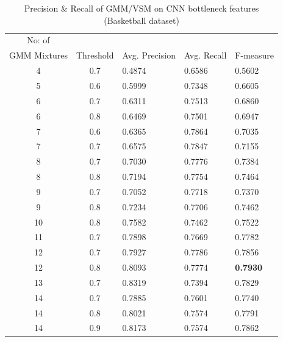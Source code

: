 \begin{table}[ht]
\caption[Event spotting using GMM/VSM on CNN(Gray,Frame diff,Edge) bottleneck features (Basketball dataset) ]{ Precision \& Recall  of GMM/VSM on CNN bottleneck features (Basketball dataset)}
\label{table:cnn_gmm_res_basket}
\centering
\begin{tabular}{|c|c|l|l|l|}
\hline
No: of &&&&\\
GMM Mixtures & Threshold & Avg. Precision & Avg. Recall & F-measure\\
\hline
\hline
4   &0.7    &0.4874     & 0.6586    &0.5602\\
5   &0.6    &0.5999     & 0.7348    &0.6605\\
6   &0.7    &0.6311     & 0.7513    &0.6860\\
6   &0.8    &0.6469     & 0.7501    &0.6947\\
7   &0.6    &0.6365     & 0.7864    &0.7035\\
7   &0.7    &0.6575     & 0.7847    &0.7155\\
8   &0.7    &0.7030     & 0.7776    &0.7384\\
8   &0.8    &0.7194     & 0.7754    &0.7464\\
9   &0.7    &0.7052     & 0.7718    &0.7370\\
9   &0.8    &0.7234     & 0.7706    &0.7462\\
10  &0.8    &0.7582     & 0.7462    &0.7522\\
11  &0.7    &0.7898     & 0.7669    &0.7782\\
12  &0.7    &0.7927     & 0.7786    &0.7856\\
12  &0.8    &0.8093     & 0.7774    &\textbf{0.7930}\\
13  &0.7    &0.8319     & 0.7394    &0.7829\\
14  &0.7    &0.7885     & 0.7601    &0.7740\\
14  &0.8    &0.8021     & 0.7574    &0.7791\\
14  &0.9    &0.8173     & 0.7574    &0.7862\\
\hline  
\end{tabular}
\end{table}


